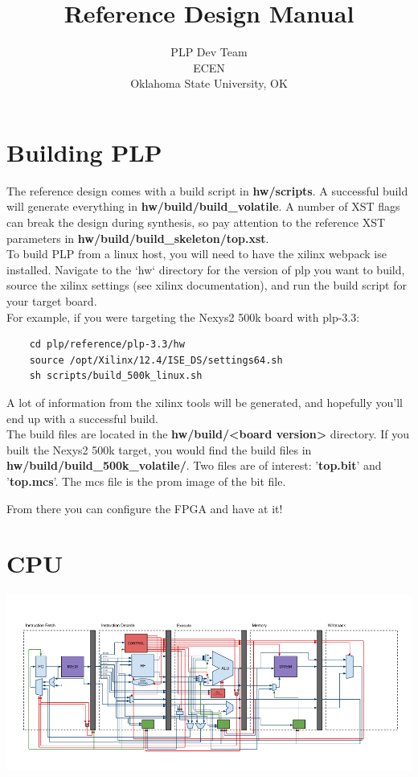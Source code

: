 \documentclass{article}
\begin{document}
\title{Reference Design Manual}
\author{PLP Dev Team\\
        ECEN \\
        Oklahoma State University, OK}
        
\maketitle

\section{Building PLP}
	The reference design comes with a build script in \textbf{hw/scripts}. A successful build will generate everything in \textbf{hw/build/build\_volatile}.
	A number of XST flags can break the design during synthesis, so pay attention to the reference XST parameters in \textbf{hw/build/build\_skeleton/top.xst}.\\


To build PLP from a linux host, you will need to have the xilinx webpack ise installed. Navigate to the `hw` directory for the version of plp you want to build, source the xilinx settings (see xilinx documentation), and run the build script for your target board.\\ 

For example, if you were targeting the Nexys2 500k board with plp-3.3:

\begin{verbatim}
    cd plp/reference/plp-3.3/hw
    source /opt/Xilinx/12.4/ISE_DS/settings64.sh
    sh scripts/build_500k_linux.sh
\end{verbatim}
A lot of information from the xilinx tools will be generated, and hopefully you'll end up with a successful build.\\

The build files are located in the \textbf{hw/build/\textless board version\textgreater} directory. If you built the Nexys2 500k target, you would find the build files in \textbf{hw/build/build\_500k\_volatile/}.
Two files are of interest: '\textbf{top.bit}' and '\textbf{top.mcs}'. The mcs file is the prom image of the bit file.

From there you can configure the FPGA and have at it!
\pagebreak
\section{CPU}
\includegraphics[scale=0.6]{../../images/CPUDiagram.png} 
\end{document}
